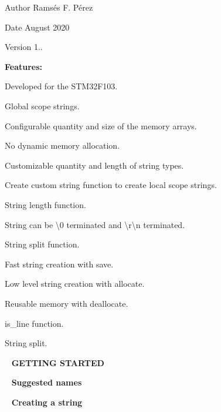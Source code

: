 \begin{DoxyAuthor}{Author}
Ramsés F. Pérez 
\end{DoxyAuthor}
\begin{DoxyDate}{Date}
August 2020 
\end{DoxyDate}
\begin{DoxyVersion}{Version}
1..
\end{DoxyVersion}
{\bfseries{Features\+:}}


\begin{DoxyItemize}
\item Developed for the S\+T\+M32\+F103.
\item Global scope strings.
\item Configurable quantity and size of the memory arrays.
\item No dynamic memory allocation.
\item Customizable quantity and length of string types.
\item Create custom string function to create local scope strings.
\item String length function.
\item String can be \textbackslash{}0 terminated and \textbackslash{}r\textbackslash{}n terminated.
\item String split function.
\item Fast string creation with save.
\item Low level string creation with allocate.
\item Reusable memory with deallocate.
\item is\+\_\+line function.
\item String split.
\end{DoxyItemize}

~\newline
{\bfseries{G\+E\+T\+T\+I\+NG S\+T\+A\+R\+T\+ED}}

~\newline
{\bfseries{Suggested names}} ~\newline
 
\begin{DoxyCode}{0}
\end{DoxyCode}


~\newline
{\bfseries{Creating a string}} ~\newline
 

